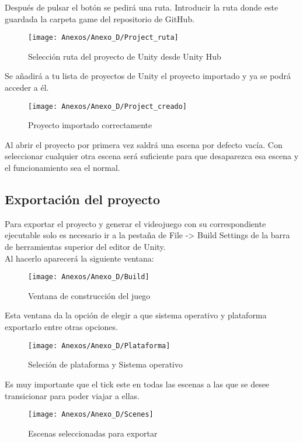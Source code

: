 Después de pulsar el botón se pedirá una ruta. Introducir la ruta donde este guardada la carpeta game del repositorio de GitHub.

\begin{figure}[h]
\centering
\texttt{[image: Anexos/Anexo\_D/Project\_ruta]}
\caption{Selección ruta del proyecto de Unity desde Unity Hub}
\end{figure}

Se añadirá a tu lista de proyectos de Unity el proyecto importado y ya se podrá acceder a él.

\begin{figure}[h]
\centering
\texttt{[image: Anexos/Anexo\_D/Project\_creado]}
\caption{Proyecto importado correctamente}
\end{figure}

Al abrir el proyecto por primera vez saldrá una escena por defecto vacía. Con seleccionar cualquier otra escena será suficiente para que desaparezca esa escena y el funcionamiento sea el normal.

\subsection{Exportación del proyecto}
Para exportar el proyecto y generar el videojuego con su correspondiente ejecutable solo es necesario ir a la pestaña de File -> Build Settings de la barra de herramientas superior del editor de Unity.\\
Al hacerlo aparecerá la siguiente ventana:

\begin{figure}[h]
\centering
\texttt{[image: Anexos/Anexo\_D/Build]}
\caption{Ventana de construcción del juego}
\end{figure}

Esta ventana da la opción de elegir a que sistema operativo y plataforma exportarlo entre otras opciones.

\begin{figure}[h]
\centering
\texttt{[image: Anexos/Anexo\_D/Plataforma]}
\caption{Seleción de plataforma y Sistema operativo}
\end{figure}

Es muy importante que el tick este en todas las escenas a las que se desee transicionar para poder viajar a ellas.

\begin{figure}[h]
\centering
\texttt{[image: Anexos/Anexo\_D/Scenes]}
\caption{Escenas seleccionadas para exportar}
\end{figure}

